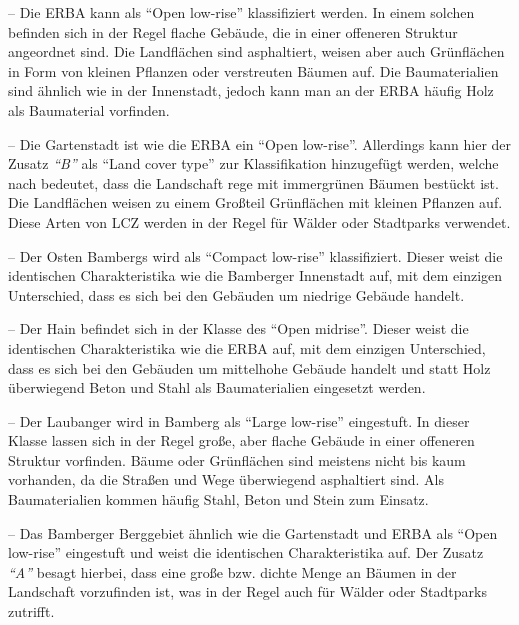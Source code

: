  -- Die ERBA kann als \enquote{Open low-rise} klassifiziert werden. In einem solchen befinden sich in der Regel flache Gebäude, die in einer offeneren Struktur angeordnet sind. Die Landflächen sind asphaltiert, weisen aber auch Grünflächen in Form von kleinen Pflanzen oder verstreuten Bäumen auf. Die Baumaterialien sind ähnlich wie in der Innenstadt, jedoch kann man an der ERBA häufig Holz als Baumaterial vorfinden.

 -- Die Gartenstadt ist wie die ERBA ein \enquote{Open low-rise}. Allerdings kann hier der Zusatz \textit{\enquote{B}} als \enquote{Land cover type} zur Klassifikation hinzugefügt werden, welche nach \cite{stewart2012local} bedeutet, dass die Landschaft rege mit immergrünen Bäumen bestückt ist. Die Landflächen weisen zu einem Großteil Grünflächen mit kleinen Pflanzen auf. Diese Arten von \ac{LCZ} werden in der Regel für Wälder oder Stadtparks verwendet.

 -- Der Osten Bambergs wird als \enquote{Compact low-rise} klassifiziert. Dieser weist die identischen Charakteristika wie die Bamberger Innenstadt auf, mit dem einzigen Unterschied, dass es sich bei den Gebäuden um niedrige Gebäude handelt.

 -- Der Hain befindet sich in der Klasse des \enquote{Open midrise}. Dieser weist die identischen Charakteristika wie die ERBA auf, mit dem einzigen Unterschied, dass es sich bei den Gebäuden um mittelhohe Gebäude handelt und statt Holz überwiegend Beton und Stahl als Baumaterialien eingesetzt werden.

 -- Der Laubanger wird in Bamberg als \enquote{Large low-rise} eingestuft. In dieser Klasse lassen sich in der Regel große, aber flache Gebäude in einer offeneren Struktur vorfinden. Bäume oder Grünflächen sind meistens nicht bis kaum vorhanden, da die Straßen und Wege überwiegend asphaltiert sind. Als Baumaterialien kommen häufig Stahl, Beton und Stein zum Einsatz.

 -- Das Bamberger Berggebiet ähnlich wie die Gartenstadt und ERBA als \enquote{Open low-rise} eingestuft und weist die identischen Charakteristika auf. Der Zusatz \textit{\enquote{A}} besagt hierbei, dass eine große bzw. dichte Menge an Bäumen in der Landschaft vorzufinden ist, was in der Regel auch für Wälder oder Stadtparks zutrifft.

